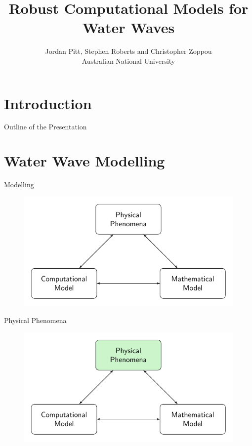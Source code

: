 \documentclass[pdf]{beamer}
\title{Robust Computational Models for Water Waves}
\author{Jordan Pitt, Stephen Roberts and Christopher Zoppou \\ Australian National University}
\begin{document}
\section{Introduction}
\begin{frame}
\titlepage
\end{frame}
\begin{frame}{Outline of the Presentation}
	
\end{frame}

\section{Water Wave Modelling}
\begin{frame}{Modelling}
	\begin{figure}
		\includegraphics[width=\textwidth]{./Pics/ModelDiagrams/FlowChart.pdf}
	\end{figure}
\end{frame}
\begin{frame}{Physical Phenomena}
	\begin{figure}
		\includegraphics[width=\textwidth]{./Pics/ModelDiagrams/FlowChartHigh1G.pdf}
	\end{figure}
\end{frame}
\end{document}
